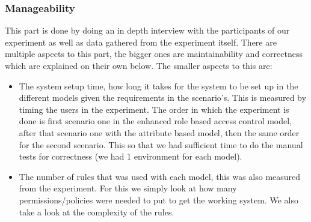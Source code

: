 \subsubsection{Manageability}
This part is done by doing an in depth interview with the participants of our experiment as well as data gathered from the experiment itself.
There are multiple aspects to this part, the bigger ones are maintainability and correctness which are explained on their own below.
The smaller aspects to this are:
\begin{itemize}
    \item The system setup time, how long it takes for the system to be set up in the different models given the requirements in the scenario's.
    This is measured by timing the users in the experiment.
    The order in which the experiment is done is first scenario one in the enhanced role based access control model, after that scenario one with the attribute based model, then the same order for the second scenario.
    This so that we had sufficient time to do the manual tests for correctness (we had 1 environment for each model).
    \item The number of rules that was used with each model, this was also measured from the experiment.
    For this we simply look at how many permissions/policies were needed to put to get the working system.
    We also take a look at the complexity of the rules.
\end{itemize}

